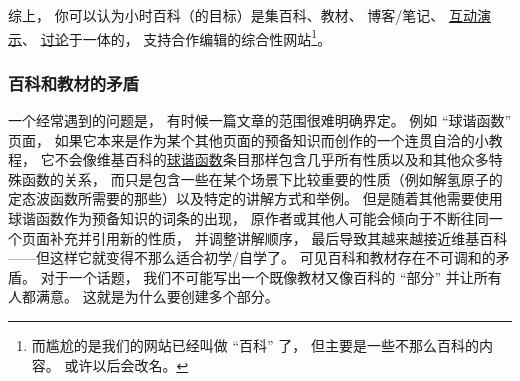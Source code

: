 综上， 你可以认为小时百科（的目标）是集百科、教材、 博客/笔记、 \href{http://wuli.wiki/apps}{互动演示}、 \href{http://wuli.wiki/forum}{讨论}于一体的， 支持合作编辑的综合性网站\footnote{而尴尬的是我们的网站已经叫做 “百科” 了， 但主要是一些不那么百科的内容。 或许以后会改名。}。






\subsubsection{百科和教材的矛盾}
一个经常遇到的问题是， 有时候一篇文章的范围很难明确界定。 例如 “球谐函数” 页面， 如果它本来是作为某个其他页面的预备知识而创作的一个连贯自洽的小教程， 它不会像维基百科的\href{https://en.wikipedia.org/wiki/Spherical_harmonics}{球谐函数}条目那样包含几乎所有性质以及和其他众多特殊函数的关系， 而只是包含一些在某个场景下比较重要的性质（例如解氢原子的定态波函数所需要的那些）以及特定的讲解方式和举例。 但是随着其他需要使用球谐函数作为预备知识的词条的出现， 原作者或其他人可能会倾向于不断往同一个页面补充并引用新的性质， 并调整讲解顺序， 最后导致其越来越接近维基百科——但这样它就变得不那么适合初学/自学了。 可见百科和教材存在不可调和的矛盾。 对于一个话题， 我们不可能写出一个既像教材又像百科的 “部分” 并让所有人都满意。 这就是为什么要创建多个部分。

